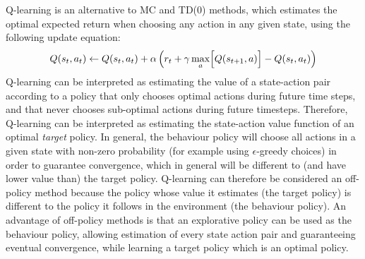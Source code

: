 Q-learning is an alternative to MC and TD(0) methods, which estimates the optimal expected return when choosing any action in any given state, using the following update equation:
\begin{equation*}
    Q(s_t, a_t) \leftarrow Q(s_t, a_t) + \alpha \left( r_t + \gamma \max_a \Bigl[ Q(s_{t+1}, a) \Bigr] - Q(s_t, a_t) \right)
\end{equation*}
Q-learning can be interpreted as estimating the value of a state-action pair according to a policy that only chooses optimal actions during future time steps, and that never chooses sub-optimal actions during future timesteps. Therefore, Q-learning can be interpreted as estimating the state-action value function of an optimal \emph{target} policy. In general, the behaviour policy will choose all actions in a given state with non-zero probability (for example using $\epsilon$-greedy choices) in order to guarantee convergence, which in general will be different to (and have lower value than) the target policy. Q-learning can therefore be considered an off-policy method because the policy whose value it estimates (the target policy) is different to the policy it follows in the environment (the behaviour policy). An advantage of off-policy methods is that an explorative policy can be used as the behaviour policy, allowing estimation of every state action pair and guaranteeing eventual convergence, while learning a target policy which is an optimal policy.
